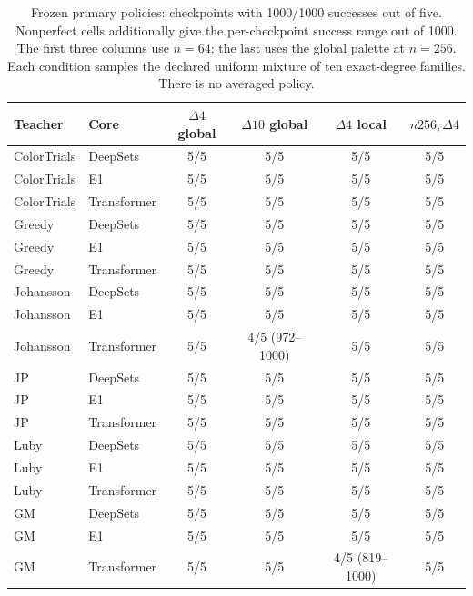 \begin{table}[htbp]
\centering\small
\begin{tabular}{llcccc}
\toprule
Teacher & Core & $\Delta4$ global & $\Delta10$ global & $\Delta4$ local & $n256,\Delta4$ \\
\midrule
ColorTrials & DeepSets & 5/5 & 5/5 & 5/5 & 5/5 \\
ColorTrials & E1 & 5/5 & 5/5 & 5/5 & 5/5 \\
ColorTrials & Transformer & 5/5 & 5/5 & 5/5 & 5/5 \\
Greedy & DeepSets & 5/5 & 5/5 & 5/5 & 5/5 \\
Greedy & E1 & 5/5 & 5/5 & 5/5 & 5/5 \\
Greedy & Transformer & 5/5 & 5/5 & 5/5 & 5/5 \\
Johansson & DeepSets & 5/5 & 5/5 & 5/5 & 5/5 \\
Johansson & E1 & 5/5 & 5/5 & 5/5 & 5/5 \\
Johansson & Transformer & 5/5 & 4/5 (972--1000) & 5/5 & 5/5 \\
JP & DeepSets & 5/5 & 5/5 & 5/5 & 5/5 \\
JP & E1 & 5/5 & 5/5 & 5/5 & 5/5 \\
JP & Transformer & 5/5 & 5/5 & 5/5 & 5/5 \\
Luby & DeepSets & 5/5 & 5/5 & 5/5 & 5/5 \\
Luby & E1 & 5/5 & 5/5 & 5/5 & 5/5 \\
Luby & Transformer & 5/5 & 5/5 & 5/5 & 5/5 \\
GM & DeepSets & 5/5 & 5/5 & 5/5 & 5/5 \\
GM & E1 & 5/5 & 5/5 & 5/5 & 5/5 \\
GM & Transformer & 5/5 & 5/5 & 4/5 (819--1000) & 5/5 \\
\bottomrule
\end{tabular}
\caption{Frozen primary policies: checkpoints with 1000/1000 successes out
of five. Nonperfect cells additionally give the per-checkpoint success
range out of 1000. The first three columns use $n=64$; the last uses the
global palette at $n=256$. Each condition samples the declared uniform
mixture of ten exact-degree families. There is no averaged policy.}
\label{tab:frozen-degree}
\end{table}
